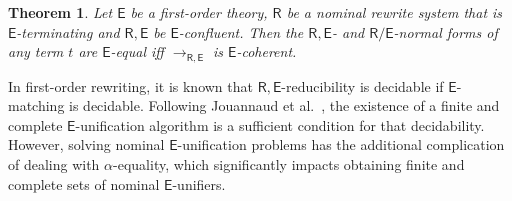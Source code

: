 \documentclass[submission,copyright,creativecommons]{eptcs}
\newcommand{\daniele}[1]{\textcolor{cyan}{#1}}
\newcommand{\caleq}{\approx_{\alpha,\theory{C}}}
\newcommand{\alert}[1]{\textcolor{red}{#1}}
\newcommand{\theory}[1]{\ensuremath{\mathsf{#1}}}
\theoremstyle{plain}
\newtheorem{theorem}{Theorem}[section]
\newtheorem{proposition}[theorem]{Proposition}
\theoremstyle{definition}
\theoremstyle{remark}
\begin{document}

\begin{theorem}\label{prop:nom-e-coherence}
Let \theory{E}
be a first-order theory, 
\theory{R} be a nominal rewrite system that is
\theory{E}-terminating
and \theory{R,E} be \theory{E}-confluent. 
Then the \theory{R,E}- and \theory{R/E}-normal forms of any term $t$ are \theory{E}-equal iff $\to_{\theory{R,E}}$ is \theory{E}-coherent.
\end{theorem}






In first-order rewriting, it is known that  $\theory{R,E}$-reducibility is decidable if  $\theory{E}$-matching is decidable.  Following Jouannaud et al.~\cite{JouannaudKK83:Incremental},   the existence of a finite and complete $\theory{E}$-unification 
algorithm is a sufficient condition for that decidability. 
However, solving nominal $\theory{E}$-unification problems has the additional complication of dealing with $\alpha$-equality, which significantly impacts obtaining finite and complete sets of nominal $\theory{E}$-unifiers.



\end{document}
